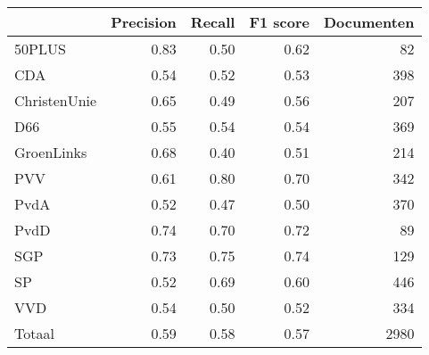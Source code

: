\begin{tabular}{lrrrr}
\toprule
{} &  Precision &  Recall &  F1 score &  Documenten \\
\midrule
50PLUS       &       0.83 &    0.50 &      0.62 &          82 \\
CDA          &       0.54 &    0.52 &      0.53 &         398 \\
ChristenUnie &       0.65 &    0.49 &      0.56 &         207 \\
D66          &       0.55 &    0.54 &      0.54 &         369 \\
GroenLinks   &       0.68 &    0.40 &      0.51 &         214 \\
PVV          &       0.61 &    0.80 &      0.70 &         342 \\
PvdA         &       0.52 &    0.47 &      0.50 &         370 \\
PvdD         &       0.74 &    0.70 &      0.72 &          89 \\
SGP          &       0.73 &    0.75 &      0.74 &         129 \\
SP           &       0.52 &    0.69 &      0.60 &         446 \\
VVD          &       0.54 &    0.50 &      0.52 &         334 \\
Totaal       &       0.59 &    0.58 &      0.57 &        2980 \\
\bottomrule
\end{tabular}
